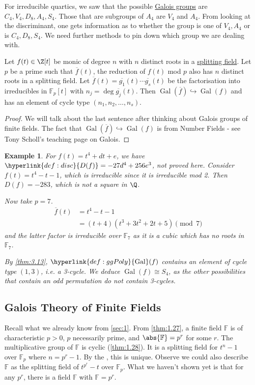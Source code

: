 \documentclass{article}
\DeclareMathOperator{\Gal}{Gal}
\newtheorem{nexample}[nthm]{Example}
\newcommand{\F}{\mathbb{F}}
\begin{document}
For irreducible quartics, we saw that the possible \hyperlink{def:ggPoly}{Galois groups} are $C_4, V_4, D_8, A_4, S_4$.
Those that are subgroups of $A_4$ are $V_4$ and $A_4$.
From looking at the discriminant, one gets information as to whether the group is one of $V_4, A_4$ or is $C_4, D_8, S_4$.
We need further methods to pin down which group we are dealing with.

\begin{nthm}\label{thm:3.13}
    Let $f(t) \in \Z[t]$ be monic of degree $n$ with $n$ distinct roots in a \hyperlink{def:splitting}{splitting field}.
    Let $p$ be a prime such that $\overline{f}(t)$, the reduction of $f(t)$ mod $p$ also has $n$ distinct roots in a splitting field.
    Let $\overline{f}(t) = \overline{g_1}(t) \dotsm \overline{g_s}(t)$ be the factorisation into irreducibles in $\F_p[t]$ with $n_j = \deg \overline{g_j}(t)$.
    Then $\Gal(\overline{f}) \hookrightarrow \Gal(f)$ and has an element of cycle type $(n_1, n_2, \dotsc, n_s)$.
\end{nthm}

\begin{proof}
    We will talk about the last sentence after thinking about Galois groups of finite fields.
    The fact that $\Gal(\overline{f}) \hookrightarrow \Gal(f)$ is from Number Fields - see Tony Scholl's teaching page on Galois.
\end{proof}

\begin{nexample}
    For $f(t) = t^4 + dt + e$, we have $\hyperlink{def:disc}{D(f)} = -27d^4 + 256 e^3$, not proved here.
    Consider $f(t) = t^4 - t - 1$, which is irreducible since it is irreducible mod 2.
    Then $D(f) = -283$, which is not a square in $\Q$.

    Now take $p=7$.
    \begin{align*}
        \overline{f}(t) &= t^4 - t - 1 \\
                        &= (t+4)(t^3 +3t^2 + 2t + 5) \pmod{7}
    \end{align*}
    and the latter factor is irreducible over $\F_7$ as it is a cubic which has no roots in $\F_7$.

    By \cref{thm:3.13}, $\hyperlink{def:ggPoly}{\Gal}(f)$ contains an element of cycle type $(1,3)$, i.e. a 3-cycle.
    We deduce $\Gal(f) \cong S_4$, as the other possibilities that contain an odd permutation do not contain 3-cycles.
\end{nexample}

\subsection{Galois Theory of Finite Fields}
Recall what we already know from \cref{sec:1}.
From \cref{thm:1.27}, a finite field $\F$ is of characteristic $p>0$, $p$ necessarily prime, and $\abs{\F}=p^r$ for some $r$.
The multiplicative group of $\F$ is cyclic (\cref{thm:1.28}).
It is a splitting field for $t^n-1$ over $\F_p$ where $n = p^r - 1$.
By the , this is unique.
Observe we could also describe $\F$ as the splitting field of $t^{p^r}-t$ over $\F_p$.
What we haven't shown yet is that for any $p^r$, there is a field $\F$ with $\F = p^r$.
\end{document}
